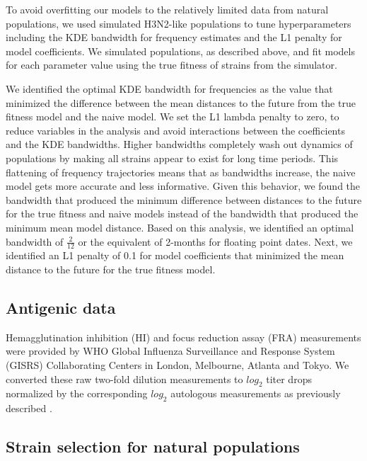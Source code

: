 To avoid overfitting our models to the relatively limited data from natural populations, we used simulated H3N2-like populations to tune hyperparameters including the KDE bandwidth for frequency estimates and the L1 penalty for model coefficients.
We simulated populations, as described above, and fit models for each parameter value using the true fitness of strains from the simulator.

We identified the optimal KDE bandwidth for frequencies as the value that minimized the difference between the mean distances to the future from the true fitness model and the naive model.
We set the L1 lambda penalty to zero, to reduce variables in the analysis and avoid interactions between the coefficients and the KDE bandwidths.
Higher bandwidths completely wash out dynamics of populations by making all strains appear to exist for long time periods.
This flattening of frequency trajectories means that as bandwidths increase, the naive model gets more accurate and less informative.
Given this behavior, we found the bandwidth that produced the minimum difference between distances to the future for the true fitness and naive models instead of the bandwidth that produced the minimum mean model distance.
Based on this analysis, we identified an optimal bandwidth of $\frac{2}{12}$ or the equivalent of 2-months for floating point dates.
Next, we identified an L1 penalty of 0.1 for model coefficients that minimized the mean distance to the future for the true fitness model.

\subsection*{Antigenic data}

Hemagglutination inhibition (HI) and focus reduction assay (FRA) measurements were provided by WHO Global Influenza Surveillance and Response System (GISRS) Collaborating Centers in London, Melbourne, Atlanta and Tokyo.
We converted these raw two-fold dilution measurements to $log_{2}$ titer drops normalized by the corresponding $log_{2}$ autologous measurements as previously described \citep{Neher:2016hy}.

\subsection*{Strain selection for natural populations}

